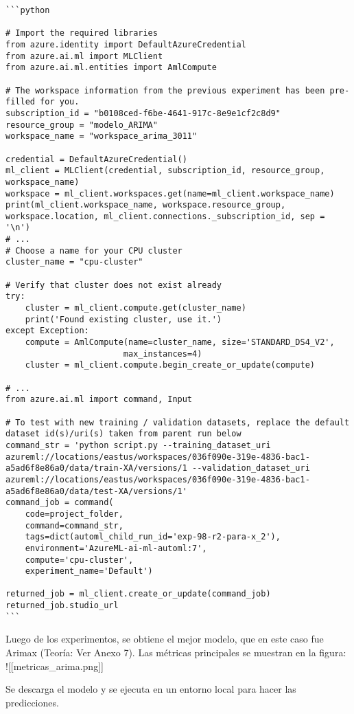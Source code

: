 \begin{verbatim}
```python

# Import the required libraries
from azure.identity import DefaultAzureCredential
from azure.ai.ml import MLClient
from azure.ai.ml.entities import AmlCompute

# The workspace information from the previous experiment has been pre-filled for you.
subscription_id = "b0108ced-f6be-4641-917c-8e9e1cf2c8d9"
resource_group = "modelo_ARIMA"
workspace_name = "workspace_arima_3011"

credential = DefaultAzureCredential()
ml_client = MLClient(credential, subscription_id, resource_group, workspace_name)
workspace = ml_client.workspaces.get(name=ml_client.workspace_name)
print(ml_client.workspace_name, workspace.resource_group, workspace.location, ml_client.connections._subscription_id, sep = '\n')
# ...
# Choose a name for your CPU cluster
cluster_name = "cpu-cluster"

# Verify that cluster does not exist already
try:
    cluster = ml_client.compute.get(cluster_name)
    print('Found existing cluster, use it.')
except Exception:
    compute = AmlCompute(name=cluster_name, size='STANDARD_DS4_V2',
                        max_instances=4)
    cluster = ml_client.compute.begin_create_or_update(compute)

# ...
from azure.ai.ml import command, Input

# To test with new training / validation datasets, replace the default dataset id(s)/uri(s) taken from parent run below
command_str = 'python script.py --training_dataset_uri azureml://locations/eastus/workspaces/036f090e-319e-4836-bac1-a5ad6f8e86a0/data/train-XA/versions/1 --validation_dataset_uri azureml://locations/eastus/workspaces/036f090e-319e-4836-bac1-a5ad6f8e86a0/data/test-XA/versions/1'
command_job = command(
    code=project_folder,
    command=command_str,
    tags=dict(automl_child_run_id='exp-98-r2-para-x_2'),
    environment='AzureML-ai-ml-automl:7',
    compute='cpu-cluster',
    experiment_name='Default')

returned_job = ml_client.create_or_update(command_job)
returned_job.studio_url
```
\end{verbatim}

Luego de los experimentos, se obtiene el mejor modelo, que en este caso
fue Arimax (Teoría: Ver Anexo 7). Las métricas principales se muestran
en la figura: !{[}{[}metricas\_arima.png{]}{]}

Se descarga el modelo y se ejecuta en un entorno local para hacer las
predicciones.

